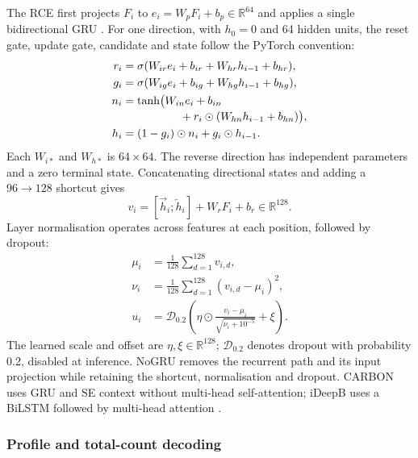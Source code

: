 \documentclass[webpdf,contemporary,large]{oup-authoring-template}
\begin{document}
The RCE first projects $F_i$ to $e_i=W_pF_i+b_p\in\mathbb R^{64}$ and applies a single bidirectional GRU \citep{cho2014rnnencoder,schuster1997brnn}. For one direction, with $h_0=0$ and 64 hidden units, the reset gate, update gate, candidate and state follow the PyTorch convention:
\begin{align}
r_i&=\sigma(W_{ir}e_i+b_{ir}+W_{hr}h_{i-1}+b_{hr}),
\label{eq:gru_reset}\\
g_i&=\sigma(W_{ig}e_i+b_{ig}+W_{hg}h_{i-1}+b_{hg}),
\label{eq:gru_update}\\
n_i&=\tanh\!\big(W_{in}e_i+b_{in}
\nonumber\\[-2pt]
&\hspace{18mm}+r_i\odot(W_{hn}h_{i-1}+b_{hn})\big),
\label{eq:gru_candidate}\\
h_i&=(1-g_i)\odot n_i+g_i\odot h_{i-1}.
\label{eq:gru_state}
\end{align}
Each $W_{i*}$ and $W_{h*}$ is $64\times64$. The reverse direction has independent parameters and a zero terminal state. Concatenating directional states and adding a $96\rightarrow128$ shortcut gives
\begin{equation}
v_i=[\overrightarrow h_i;\overleftarrow h_i]+W_rF_i+b_r
\in\mathbb R^{128}.
\label{eq:bidirectional_sum}
\end{equation}
Layer normalisation \citep{ba2016layernorm} operates across features at each position, followed by dropout:
\begin{equation}
\begin{aligned}
\mu_i&=\frac1{128}\sum_{d=1}^{128}v_{i,d},\\
\nu_i&=\frac1{128}\sum_{d=1}^{128}(v_{i,d}-\mu_i)^2,\\
u_i&=\mathcal D_{0.2}\!\left(
\eta\odot\frac{v_i-\mu_i}{\sqrt{\nu_i+10^{-5}}}+\xi\right).
\end{aligned}
\label{eq:recurrent_residual}
\end{equation}
The learned scale and offset are $\eta,\xi\in\mathbb R^{128}$; $\mathcal D_{0.2}$ denotes dropout with probability 0.2, disabled at inference. NoGRU removes the recurrent path and its input projection while retaining the shortcut, normalisation and dropout. CARBON uses GRU and SE context without multi-head self-attention; iDeepB uses a BiLSTM followed by multi-head attention \citep{liu2025ideepb}.

\subsubsection{Profile and total-count decoding}
\end{document}
